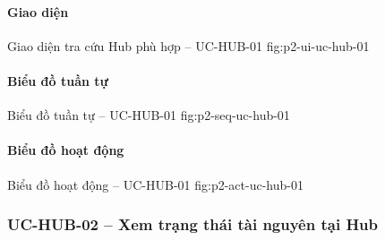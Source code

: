 \par\medskip
\noindent\begin{minipage}{\linewidth}
\paragraph{Giao diện}
  {Giao diện tra cứu Hub phù hợp -- UC-HUB-01}
  {fig:p2-ui-uc-hub-01}
  {}
\end{minipage}\par

\clearpage
\paragraph{Biểu đồ tuần tự}
  {Biểu đồ tuần tự -- UC-HUB-01}
  {fig:p2-seq-uc-hub-01}

\clearpage
\paragraph{Biểu đồ hoạt động}
  {Biểu đồ hoạt động -- UC-HUB-01}
  {fig:p2-act-uc-hub-01}

\clearpage

\subsubsection{UC-HUB-02 -- Xem trạng thái tài nguyên tại Hub}


